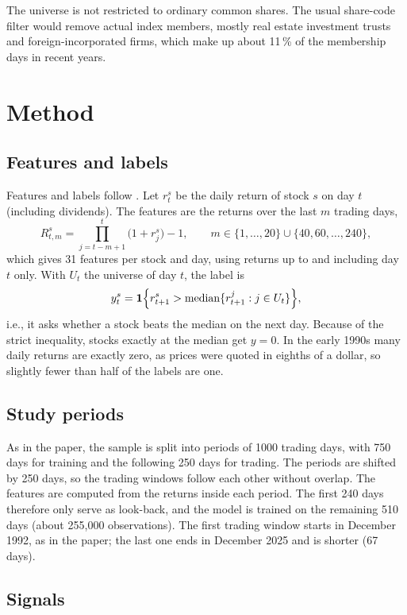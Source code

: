 \documentclass[11pt,a4paper]{article}
\theoremstyle{definition}
\theoremstyle{remark}
\begin{document}
The universe is not restricted to ordinary common shares. The usual share-code
filter would remove actual index members, mostly real estate investment trusts
and foreign-incorporated firms, which make up about 11\,\% of the membership
days in recent years.


\section{Method}

\subsection{Features and labels}

Features and labels follow \citet{krauss2017deep}. Let $r^s_t$ be the daily
return of stock $s$ on day $t$ (including dividends). The features are the
returns over the last $m$ trading days,
\[
  R^s_{t,m} = \prod_{j=t-m+1}^{t} \bigl(1 + r^s_j\bigr) - 1,
  \qquad m \in \{1, \dots, 20\} \cup \{40, 60, \dots, 240\},
\]
which gives 31 features per stock and day, using returns up to and including
day $t$ only. With $U_t$ the universe of day $t$, the label is
\[
  y^s_t = \mathbf{1}\Bigl\{ r^s_{t+1} > \operatorname{median}\{ r^j_{t+1} : j \in U_t \} \Bigr\},
\]
i.e., it asks whether a stock beats the median on the next day. Because of
the strict inequality, stocks exactly at the median get $y = 0$. In the early
1990s many daily returns are exactly zero, as prices were quoted in eighths of
a dollar, so slightly fewer than half of the labels are one.

\subsection{Study periods}

As in the paper, the sample is split into periods of 1000 trading days, with
750 days for training and the following 250 days for trading. The periods are
shifted by 250 days, so the trading windows follow each other without overlap.
The features are computed from the returns inside each period. The first 240
days therefore only serve as look-back, and the model is trained on the
remaining 510 days (about 255{,}000 observations). The first trading window
starts in December 1992, as in the paper; the last one ends in December 2025
and is shorter (67 days).

\subsection{Signals}
\end{document}
